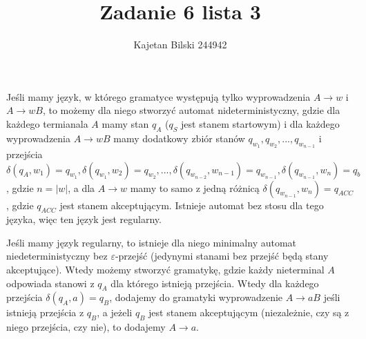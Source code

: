 \documentclass{article}
\title{Zadanie 6 lista 3}
\author{Kajetan Bilski 244942}
\begin{document}
	\maketitle

Jeśli mamy język, w którego gramatyce występują tylko wyprowadzenia $A \to w$ i $A \to wB$, to możemy dla niego stworzyć automat nideterministyczny, gdzie dla każdego termianala $A$ mamy stan $q_A$ ($q_S$ jest stanem startowym) i dla każdego wyprowadzenia $A \to wB$ mamy dodatkowy zbiór stanów $q_{w_1},q_{w_2},...,q_{w_{n-1}}$ i przejścia $\delta (q_A,w_1) = q_{w_1}, \delta (q_{w_1},w_2) = q_{w_2}, ... ,\delta (q_{w_{n-2}},w_{n-1}) = q_{w_{n-1}},\delta (q_{w_{n-1}},w_n) = q_b$, gdzie $n = |w|$, a dla $A \to w$ mamy to samo z jedną różnicą $\delta (q_{w_{n-1}},w_n) = q_{ACC}$, gdzie $q_{ACC}$ jest stanem akceptującym. Istnieje automat bez stosu dla tego języka, więc ten język jest regularny.

Jeśli mamy język regularny, to istnieje dla niego minimalny automat niedeterministyczny bez $\varepsilon$-przejść (jedynymi stanami bez przejść będą stany akceptujące). Wtedy możemy stworzyć gramatykę, gdzie każdy nieterminal $A$ odpowiada stanowi z $q_A$ dla którego istnieją przejścia. Wtedy dla każdego przejścia $\delta (q_A,a) = q_B$, dodajemy do gramatyki wyprowadzenie $A \to aB$ jeśli istnieją przejścia z $q_B$, a jeżeli $q_B$ jest stanem akceptującym (niezależnie, czy są z niego przejścia, czy nie), to dodajemy $A \to a$.
\end{document}

